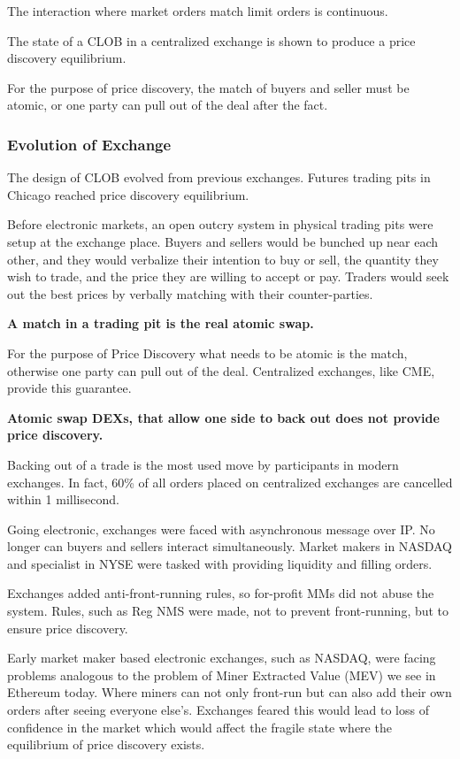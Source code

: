\documentclass[12pt]{article}
\begin{document}
The interaction where market orders match limit orders is continuous. 

The state of a CLOB in a centralized exchange is shown to produce a price discovery equilibrium. 

For the purpose of price discovery, the match of buyers and seller must be atomic, or one party can pull out of the deal after the fact. 

\subsubsection*{Evolution of Exchange}
The design of CLOB evolved from previous exchanges. Futures trading pits in Chicago reached price discovery equilibrium.  

Before electronic markets, an open outcry system in physical trading pits were setup at the exchange place. Buyers and sellers would be bunched up near each other, and they would verbalize their intention to buy or sell, the quantity they wish to trade, and the price they are willing to accept or pay. Traders would seek out the best prices by verbally matching with their counter-parties. 

\textbf{A match in a trading pit is the real atomic swap.} 

For the purpose of Price Discovery what needs to be atomic is the match, otherwise one party can pull out of the deal. Centralized exchanges, like CME, provide this guarantee. 

\textbf{Atomic swap DEXs, that allow one side to back out does not provide price discovery.}

Backing out of a trade is the most used move by participants in modern exchanges. In fact, 60\%  of all orders placed on centralized exchanges are cancelled within 1 millisecond.  

Going electronic, exchanges were faced with asynchronous message over IP. No longer can buyers and sellers interact simultaneously. Market makers in NASDAQ and specialist in NYSE were tasked with providing liquidity and filling orders. 

Exchanges added anti-front-running rules, so for-profit MMs did not abuse the system. Rules, such as Reg NMS were made, not to prevent front-running, but to ensure price discovery.

Early market maker based electronic exchanges, such as NASDAQ, were facing problems analogous to the problem of Miner Extracted Value (MEV) we see in Ethereum today. Where miners can not only front-run but can also add their own orders after seeing everyone else's. Exchanges feared this would lead to loss of confidence in the market which would affect the fragile state where the equilibrium of price discovery exists. 
\end{document}
